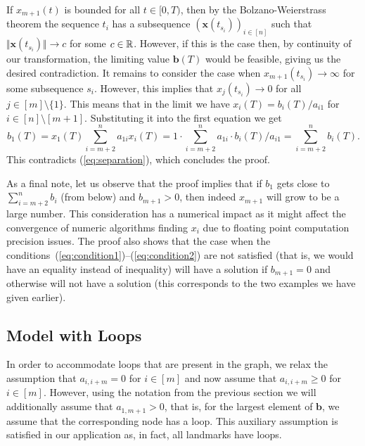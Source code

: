 If $x_{m+1}(t)$ is bounded for all $t \in [0,T)$, then by the Bolzano-Weierstrass theorem the sequence $t_i$ has a subsequence $(\mathbf{x}(t_{s_i}))_{i \in [n]}$ such that $\Vert \mathbf{x}(t_{s_i}) \Vert \to c$ for some $c \in {\mathbb R}$. However, if this is the case then, by continuity of our transformation, the limiting value $\mathbf{b}(T)$ would be feasible, giving us the desired contradiction. It remains to consider the case when $x_{m+1}(t_{s_i}) \to \infty$ for some subsequence $s_i$.
However, this implies that $x_{j}(t_{s_i})\to 0$ for all $j\in[m]\setminus\{1\}$. This means that in the limit we have $x_i(T)=b_i(T)/a_{i1}$ for $i\in[n]\setminus[m+1]$. Substituting it into the first equation we get 
$$
b_1(T) = x_1(T)\sum_{i=m+2}^na_{1i}x_i(T) = 1\cdot\sum_{i=m+2}^na_{1i}\cdot b_i(T)/a_{i1} = \sum_{i=m+2}^nb_i(T).
$$
This contradicts (\ref{eq:separation}), which concludes the proof.

\bigskip

As a final note, let us observe that the proof implies that if $b_1$ gets close to $\sum_{i=m+2}^nb_i$ (from below) and $b_{m+1}>0$, then indeed $x_{m+1}$ will grow to be a large number. This consideration has a numerical impact as it might affect the convergence of numeric algorithms finding $x_i$ due to floating point computation precision issues. The proof also shows that the case when the conditions~(\ref{eq:condition1})--(\ref{eq:condition2}) are not satisfied (that is, we would have an equality instead of inequality) will have a solution if $b_{m+1}=0$ and otherwise will not have a solution (this corresponds to the two examples we have given earlier).

\subsection{Model with Loops}

In order to accommodate loops that are present in the graph, we relax the assumption that $a_{i,i+m}=0$ for $i\in[m]$ and now assume that $a_{i,i+m} \ge 0$ for $i\in[m]$. However, using the notation from the previous section we will additionally assume that $a_{1, m+1}>0$, that is, for the largest element of $\mathbf{b}$, we assume that the corresponding node has a loop. This auxiliary assumption is satisfied in our application as, in fact, all landmarks have loops.

